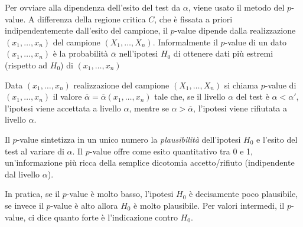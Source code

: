 Per ovviare alla dipendenza dell'esito del test da $\alpha$, viene usato il metodo del $p$-value.
A differenza della regione critica $C$, che è fissata a priori indipendentemente dall'esito del
campione, il $p$-value dipende dalla realizzazione $(x_1, \dots, x_n)$ del campione
$(X_1, \dots, X_n)$. Informalmente il $p$-value di un dato $(x_1, \dots, x_n)$ è la probabilità
$\overline{\alpha}$ nell'ipotesi $H_0$ di ottenere dati più estremi (rispetto ad $H_0$) di
$(x_1, \dots, x_n)$

\begin{definition}
	Data $(x_1, \dots, x_n)$ realizzazione del campione $(X_1, \dots, X_n)$ si chiama $p$-value di
	$(x_1, \dots, x_n)$ il valore $\overline{\alpha} = \overline{\alpha} (x_1, \dots, x_n)$ tale
	che, se il livello $\alpha$ del test è $\alpha < \alpha'$, l'ipotesi viene accettata a livello
	$\alpha$, mentre se $\alpha > \overline{\alpha}$, l'ipotesi viene rifiutata a livello $\alpha$.
\end{definition}

Il $p$-value sintetizza in un unico numero la \emph{plausibilità} dell'ipotesi $H_0$ e l'esito del
test al variare di $\alpha$. Il $p$-value offre come esito quantitativo tra 0 e 1, un'informazione
più ricca della semplice dicotomia accetto/rifiuto (indipendente dal livello $\alpha$).

In pratica, se il $p$-value è molto basso, l'ipotesi $H_0$ è decisamente poco plausibile, se invece
il $p$-value è alto allora $H_0$ è molto plausibile. Per valori intermedi, il $p$-value, ci dice
quanto forte è l'indicazione contro $H_0$.